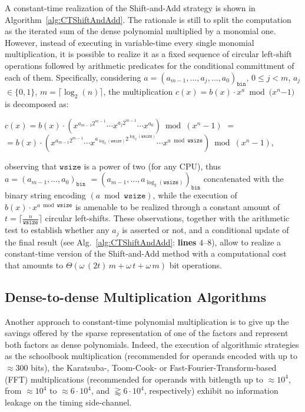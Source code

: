 A constant-time realization of the Shift-and-Add strategy is shown in Algorithm~\ref{alg:CTShiftAndAdd}. The rationale is still to split the computation 
as the iterated sum of the dense polynomial multiplied by a monomial one. 
However, instead of executing in variable-time every single monomial 
multiplication, it is possible to realize it as a fixed sequence of circular 
left-shift operations followed by arithmetic predicates for the conditional 
committment of each of them.
Specifically, considering $a$$=$$(a_{m-1}, \ldots, a_j, \ldots, a_0)_{\mathtt{bin}}$, $0$$\leq$$j$$<$$m$, $a_j$$\in$$\{0,1\}$, $m$$=$$\lceil \log_2(n) \rceil$, 
the multiplication $c(x) = b(x) \cdot x^a \bmod (x^n$$-$$1)$ is decomposed as: 
\begin{center}
$c(x) = b(x)  \cdot \left( x^{a_{m-1}2^{m-1}} \cdots x^{a_{j}2^{m-1}} \cdots x^{a_{0}} \right)\bmod (x^n-1) $ $=\phantom{MMMMMMM...}$\newline
$= b(x)  \cdot \left( x^{a_{m-1}2^{m-1}} \cdots x^{a_{\log_2(\mathtt{wsize})}2^{\log_2(\mathtt{wsize})}} \cdots x^{a \bmod \mathtt{wsize}} \right) \bmod (x^n-1)$, 
\end{center}
observing that $\mathtt{wsize}$ is a power of two (for any CPU), thus $a = (a_{m-1},  \ldots, a_0)_{\mathtt{bin}}$ $= (a_{m-1}, \ldots, a_{\log_2(\mathtt{wsize})})_{\mathtt{bin}}$ concatenated with the binary string encoding $(a \bmod \mathtt{wsize})$, while the execution of $b(x) \cdot x^{a \bmod \mathtt{wsize}}$ is amenable to be realized through a constant amount of $t=\lceil \frac{n}{\mathtt{wsize}}\rceil$ circular left-shifts. These observations, together with  the arithmetic test to establish whether any $a_j$ is asserted or not, and a conditional update of the final result (see Alg.~\ref{alg:CTShiftAndAdd}: \textbf{lines} $4$--$8$), allow to realize a constant-time version of the Shift-and-Add method with a computational cost that amounts to $\Theta\left(\omega\,(2t)\,m + \omega\, t+\omega\, m\right)$ bit operations. 

\subsection{Dense-to-dense Multiplication Algorithms}\label{subsec:CTDenseMul}
Another approach to constant-time polynomial multiplication is to give up the 
savings offered by the sparse representation of one of the factors and represent
both factors as dense polynomials. 
Indeed, the execution of algorithmic strategies as the schoolbook multiplication 
(recommended for operands encoded with up to $\approx 300$ bits), the 
Karatsuba-, Toom-Cook- or Fast-Fourier-Transform-based (FFT) multiplications 
(recommended for operands with bitlength up to $\approx 10^4$, from 
$\approx 10^4$ to $\approx 6\cdot10^4$, and $\gtrapprox 6\cdot10^4$, 
respectively) exhibit no information leakage on the timing side-channel. 
 
